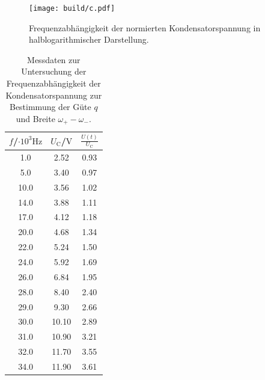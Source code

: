 \begin{figure}
	\centering
	\texttt{[image: build/c.pdf]}
	\caption{Frequenzabhängigkeit der normierten Kondensatorspannung in halblogarithmischer Darstellung.}
	\label{fig:q}
\end{figure}
\begin{table}
	\caption{Messdaten zur Untersuchung der Frequenzabhängigkeit der Kondensatorspannung zur Bestimmung der Güte $q$ und Breite $\omega_+ - \omega_- $.}
	\label{tab:Kuh}
	\centering
	\begin{tabular}{ccc}
		\toprule
		$f$/$\cdot 10^{3} \si{\Hz}$ & $U_\text{C}$/$\si{\volt}$ & $\frac{U(t)}{U_\text{C}}$ \\
		\midrule
		1.0                         & 2.52                      & 0.93                      \\
		5.0                         & 3.40                      & 0.97                      \\
		10.0                        & 3.56                      & 1.02                      \\
		14.0                        & 3.88                      & 1.11                      \\
		17.0                        & 4.12                      & 1.18                      \\
		20.0                        & 4.68                      & 1.34                      \\
		22.0                        & 5.24                      & 1.50                      \\
		24.0                        & 5.92                      & 1.69                      \\
		26.0                        & 6.84                      & 1.95                      \\
		28.0                        & 8.40                      & 2.40                      \\
		29.0                        & 9.30                      & 2.66                      \\
		30.0                        & 10.10                     & 2.89                      \\
		31.0                        & 10.90                     & 3.21                      \\
		32.0                        & 11.70                     & 3.55                      \\
		34.0                        & 11.90                     & 3.61                      \\

\end{tabular}
\end{table}
